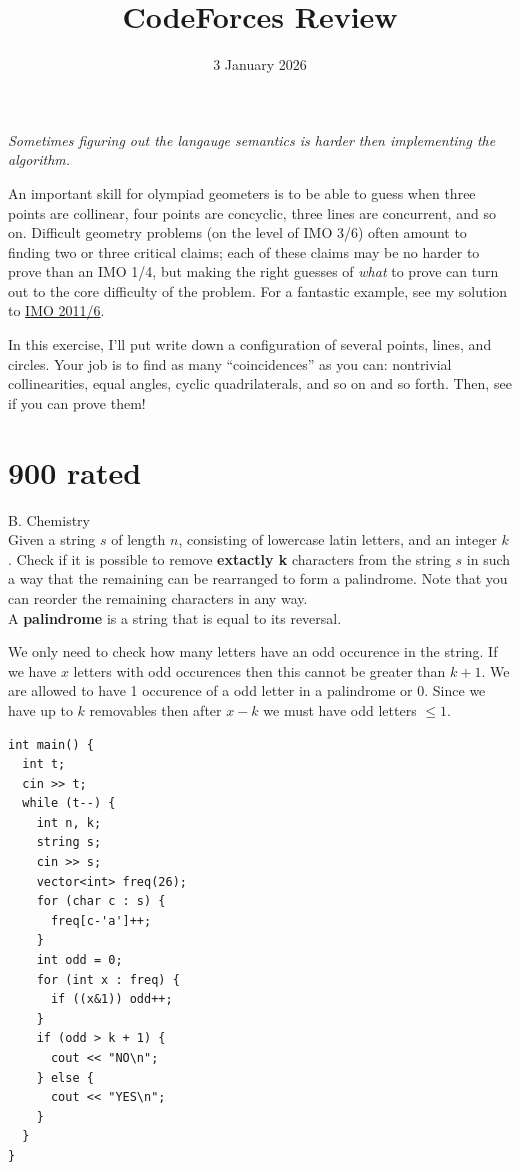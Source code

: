 \documentclass[11pt]{scrartcl}
\begin{document}
\title{CodeForces Review}
\date{3 January 2026}
\maketitle

\begin{center}
  \itshape
  Sometimes figuring out the langauge semantics is harder then implementing the algorithm.
\end{center}

An important skill for olympiad geometers is to be able to guess when three points are collinear,
four points are concyclic, three lines are concurrent, and so on.
Difficult geometry problems (on the level of IMO 3/6) often amount to finding two or three critical claims;
each of these claims may be no harder to prove than an IMO 1/4, but making the right guesses of \emph{what} to prove
can turn out to the core difficulty of the problem.
For a fantastic example, see my solution to
\href{http://www.aops.com/community/c6h418983p3518149}{IMO 2011/6}.

In this exercise, I'll put write down a configuration of several points, lines, and circles.
Your job is to find as many ``coincidences'' as you can: nontrivial collinearities, equal angles,
cyclic quadrilaterals, and so on and so forth.
Then, see if you can prove them!

\tableofcontents

\newpage

\section{900 rated}
\begin{problem}
   B. Chemistry \\

   Given a string $s$ of length $n$, consisting of lowercase latin letters, and an integer $k$. 
   Check if it is possible to remove \textbf{extactly k} characters from the string $s$ in such a way that the remaining 
   can be rearranged to form a palindrome. Note that you can reorder the remaining characters in any way. \\

   A \textbf{palindrome} is a string that is equal to its reversal.
\end{problem}

\begin{solution}
    We only need to check how many letters have an odd occurence in the string. If we have $x$ letters with odd occurences 
    then this cannot be greater than $k + 1$. We are allowed to have 1 occurence of a odd letter in a palindrome or 0. Since we 
    have up to $k$ removables then after $x - k$ we must have odd letters $\leq 1$. 
\begin{lstlisting}
int main() {
  int t;
  cin >> t;
  while (t--) {
    int n, k;
    string s;
    cin >> s;
    vector<int> freq(26);
    for (char c : s) {
      freq[c-'a']++;
    }
    int odd = 0;
    for (int x : freq) {
      if ((x&1)) odd++;
    }
    if (odd > k + 1) {
      cout << "NO\n";
    } else {
      cout << "YES\n";
    }
  }
}
\end{lstlisting}
\end{solution}
\end{document}
